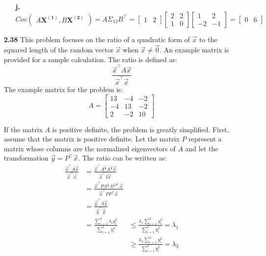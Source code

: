 \documentclass[oneside,12pt,letterpaper]{article}
\newcommand\m[1]{\begin{bmatrix}#1\end{bmatrix}}
\newcommand\p[1]{\begin{pmatrix}#1\end{pmatrix}}
\begin{document}
\begin{enumerate}
\begin{enumerate}
				\item[\textbf{j.}]
					$$Cov\p{A\boldsymbol{X^{(1)}},B\boldsymbol{X^{(2)}}} 
					= A \Sigma_{12} B^{\intercal}
					= \m{1&2} \m{2&2\\1&0} \m{1&2\\-2&-1}
					= \m{0&6}$$

			\end{enumerate}

		\pagebreak
		\item[\textbf{2.38}]
			This problem focuses on the ratio of a quadratic form of $\vec{x}$ to the squared length of the random vector $\vec{x}$ when $\vec{x} \neq \vec{0}$. An example matrix is provided for a sample calculation. The ratio is defined as: $$\frac{\vec{x}^{\intercal}A\vec{x}}{\vec{x}^{\intercal}\vec{x}}$$ The example matrix for the problem is: $$A=\m{13&-4&-2\\-4&13&-2\\2&-2&10}$$ 

			If the matrix $A$ is positive definite, the problem is greatly simplified. First, assume that the matrix is positive definite. Let the matrix $P$ represent a matrix whose columns are the normalized eigenvectors of $A$ and let the transformation $\vec{y}=P^{\intercal}\vec{x}$. The ratio can be written as:
			\begin{align*}
				\frac{\vec{x}^{\intercal}A\vec{x}}{\vec{x}^{\intercal}\vec{x}} 
				&= \frac{\vec{x}^{\intercal}A^{\frac{1}{2}}A^{\frac{1}{2}}\vec{x}}{\vec{x}^{\intercal}I\vec{x}} \\
				&= \frac{\vec{x}^{\intercal}P\Lambda^{\frac{1}{2}}\Lambda^{\frac{1}{2}P^{\intercal}}\vec{x}}{\vec{x}^{\intercal}PP^{\intercal}\vec{x}} \\
				&= \frac{\vec{y}^{\intercal}\Lambda\vec{y}}{\vec{y}^{\intercal}\vec{y}} \\
				&= \frac{\sum_{i=1}^{3}\lambda_{i}y_{i}^{2}}{\sum_{i=1}^{3}y_{i}^{2}} 
				&\leq \frac{\lambda_{1}\sum_{i=1}^{3}y_{i}^{2}}{\sum_{i=1}^{3}y_{i}^{2}} = \lambda_{1}\\
				&&\geq \frac{\lambda_{3}\sum_{i=1}^{3}y_{i}^{2}}{\sum_{i=1}^{3}y_{i}^{2}} = \lambda_{3}
			\end{align*}


\end{enumerate}
\end{document}
